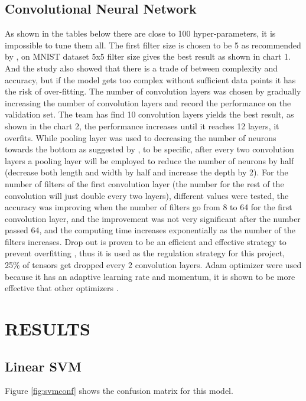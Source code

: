 \documentclass[letterpaper, 10 pt, conference]{ieeeconf}  %
\begin{document}
\subsection{Convolutional Neural Network}
As shown in the tables below there are close to 100 hyper-parameters, it is impossible to tune them all. The first filter size is chosen to be 5 as recommended by \cite{dhingra2017model}, on MNIST dataset 5x5 filter size gives the best result as shown in chart 1. And the study also showed that there is a trade of between complexity and accuracy, but if the model gets too complex without sufficient data points it has the risk of over-fitting. The number of convolution layers was chosen by gradually increasing the number of convolution layers and record the performance on the validation set. The team has find 10 convolution layers yields the best result, as shown in the chart 2, the performance increases until it reaches 12 layers, it overfits. While pooling layer was used to decreasing the number of neurons towards the bottom as suggested by \cite{lattner2016}, to be specific, after every two convolution layers a pooling layer will be employed to reduce the number of neurons by half (decrease both length and width by half and increase the depth by 2). For the number of filters of the first convolution layer (the number for the rest of the convolution will just double every two layers), different values were tested, the accuracy was improving when the number of filters go from 8 to 64 for the first convolution layer, and the improvement was not very significant after the number passed 64, and the computing time increases exponentially as the number of the filters increases. Drop out is proven to be an efficient and effective strategy to prevent overfitting \cite{srivastava2014dropout}, thus it is used as the regulation strategy for this project, 25\% of tensors get dropped every 2 convolution layers. Adam optimizer were used because it has an adaptive learning rate and momentum, it is shown to be more effective that other optimizers \cite{walia2017opt}.

\section{RESULTS}

\subsection{Linear SVM}
Figure \ref{fig:svmconf} shows the confusion matrix for this model.
\end{document}
